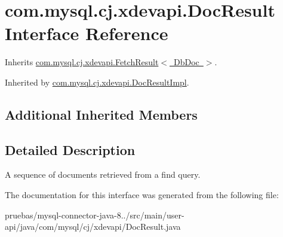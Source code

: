 \hypertarget{interfacecom_1_1mysql_1_1cj_1_1xdevapi_1_1_doc_result}{}\section{com.\+mysql.\+cj.\+xdevapi.\+Doc\+Result Interface Reference}
\label{interfacecom_1_1mysql_1_1cj_1_1xdevapi_1_1_doc_result}


Inherits \mbox{\hyperlink{interfacecom_1_1mysql_1_1cj_1_1xdevapi_1_1_fetch_result}{com.\+mysql.\+cj.\+xdevapi.\+Fetch\+Result$<$ Db\+Doc $>$}}.



Inherited by \mbox{\hyperlink{classcom_1_1mysql_1_1cj_1_1xdevapi_1_1_doc_result_impl}{com.\+mysql.\+cj.\+xdevapi.\+Doc\+Result\+Impl}}.

\subsection*{Additional Inherited Members}


\subsection{Detailed Description}
A sequence of documents retrieved from a find query. 

The documentation for this interface was generated from the following file\+:\begin{DoxyCompactItemize}
\item 
pruebas/mysql-\/connector-\/java-\/8../src/main/user-\/api/java/com/mysql/cj/xdevapi/Doc\+Result.\+java\end{DoxyCompactItemize}
